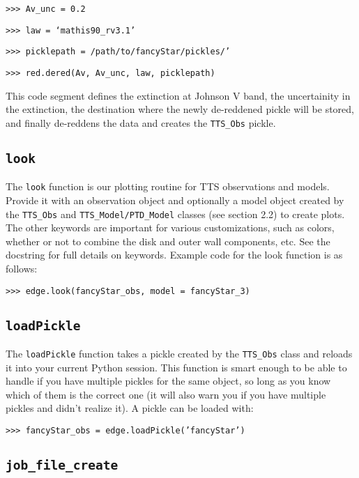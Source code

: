 \documentclass{emulateapj}
\begin{document}
\texttt{>>> Av\_unc = 0.2}

\texttt{>>> law = `mathis90\_rv3.1'}

\texttt{>>> picklepath = /path/to/fancyStar/pickles/'}

\texttt{>>> red.dered(Av, Av\_unc, law, picklepath)}
\vspace{2mm}

\noindent This code segment defines the extinction at Johnson V band, the uncertainity in the extinction, the destination where the newly de-reddened pickle will be stored, and finally de-reddens the data and creates the \texttt{TTS\_Obs} pickle. 
 
\subsection{\texttt{look}}
 
The \texttt{look} function is our plotting routine for TTS observations and models. Provide it with an observation object and optionally a model object created by the \texttt{TTS\_Obs} and \texttt{TTS\_Model}\texttt{/PTD\_Model} classes (see section 2.2) to create plots. The other keywords are important for various customizations, such as colors, whether or not to combine the disk and outer wall components, etc. See the docstring for full details on keywords. Example code for the look function is as follows:

\vspace{2mm}
\texttt{>>> edge.look(fancyStar\_obs, model = fancyStar\_3)}
\vspace{2mm}

\subsection{\texttt{loadPickle}}

The \texttt{loadPickle} function takes a pickle created by the \texttt{TTS\_Obs} class and reloads it into your current Python session. This function is smart enough to be able to handle if you have multiple pickles for the same object, so long as you know which of them is the correct one (it will also warn you if you have multiple pickles and didn’t realize it). A pickle can be loaded with:

\vspace{2mm}
\texttt{>>> fancyStar\_obs = edge.loadPickle('fancyStar')}
\vspace{2mm}

\subsection{\texttt{job\_file\_create}}
\end{document}
